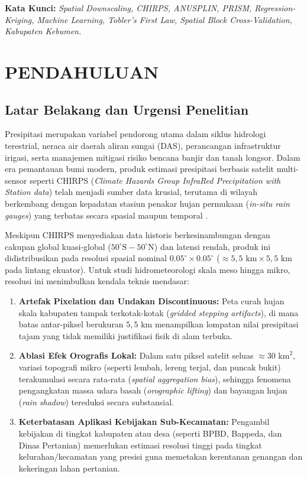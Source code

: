 \documentclass[11pt,a4paper]{article}
\begin{document}
\vspace{0.3cm}
\noindent \textbf{Kata Kunci:} \textit{Spatial Downscaling, CHIRPS, ANUSPLIN, PRISM, Regression-Kriging, Machine Learning, Tobler's First Law, Spatial Block Cross-Validation, Kabupaten Kebumen.}

\newpage
\tableofcontents
\newpage

\section{PENDAHULUAN}

\subsection{Latar Belakang dan Urgensi Penelitian}
Presipitasi merupakan variabel pendorong utama dalam siklus hidrologi terestrial, neraca air daerah aliran sungai (DAS), perancangan infrastruktur irigasi, serta manajemen mitigasi risiko bencana banjir dan tanah longsor. Dalam era pemantauan bumi modern, produk estimasi presipitasi berbasis satelit multi-sensor seperti CHIRPS (\textit{Climate Hazards Group InfraRed Precipitation with Station data}) telah menjadi sumber data krusial, terutama di wilayah berkembang dengan kepadatan stasiun penakar hujan permukaan (\textit{in-situ rain gauges}) yang terbatas secara spasial maupun temporal \cite{funk2015chirps}.

Meskipun CHIRPS menyediakan data historis berkesinambungan dengan cakupan global kuasi-global ($50^\circ\text{S} - 50^\circ\text{N}$) dan latensi rendah, produk ini didistribusikan pada resolusi spasial nominal $0.05^\circ \times 0.05^\circ$ ($\approx 5,5\text{ km} \times 5,5\text{ km}$ pada lintang ekuator). Untuk studi hidrometeorologi skala meso hingga mikro, resolusi ini menimbulkan kendala teknis mendasar:
\begin{enumerate}
    \item \textbf{Artefak Pixelation dan Undakan Discontinuous:} Peta curah hujan skala kabupaten tampak terkotak-kotak (\textit{gridded stepping artifacts}), di mana batas antar-piksel berukuran $5,5\text{ km}$ menampilkan lompatan nilai presipitasi tajam yang tidak memiliki justifikasi fisik di alam terbuka.
    \item \textbf{Ablasi Efek Orografis Lokal:} Dalam satu piksel satelit seluas $\approx 30\text{ km}^2$, variasi topografi mikro (seperti lembah, lereng terjal, dan puncak bukit) terakumulasi secara rata-rata (\textit{spatial aggregation bias}), sehingga fenomena pengangkatan massa udara basah (\textit{orographic lifting}) dan bayangan hujan (\textit{rain shadow}) tereduksi secara substansial.
    \item \textbf{Keterbatasan Aplikasi Kebijakan Sub-Kecamatan:} Pengambil kebijakan di tingkat kabupaten atau desa (seperti BPBD, Bappeda, dan Dinas Pertanian) memerlukan estimasi resolusi tinggi pada tingkat kelurahan/kecamatan yang presisi guna memetakan kerentanan genangan dan kekeringan lahan pertanian.
\end{enumerate}
\end{document}
